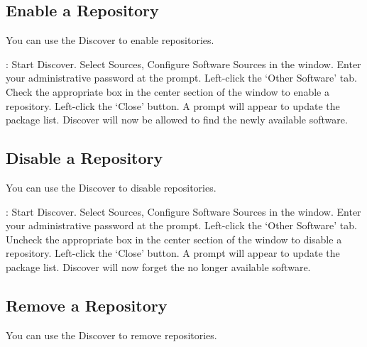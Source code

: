 \documentclass[letterpaper,10pt,english]{sphinxmanual}
\begin{document}




\subsection{Enable a Repository}
\label{\detokenize{docs/repositories:enable-a-repository}}
You can use the Discover to enable repositories.

: Start Discover. Select Sources, Configure Software Sources in the window. Enter your administrative password at the prompt. Left-click the ‘Other Software’ tab. Check the appropriate box in the center section of the window to enable a repository. Left-click the ‘Close’ button. A prompt will appear to update the package list. Discover will now be allowed to find the newly available software.


\subsection{Disable a Repository}
\label{\detokenize{docs/repositories:disable-a-repository}}
You can use the Discover to disable repositories.

: Start Discover. Select Sources, Configure Software Sources in the window. Enter your administrative password at the prompt. Left-click the ‘Other Software’ tab. Uncheck the appropriate box in the center section of the window to disable a repository. Left-click the ‘Close’ button. A prompt will appear to update the package list. Discover will now forget the no longer available software.


\subsection{Remove a Repository}
\label{\detokenize{docs/repositories:remove-a-repository}}
You can use the Discover to remove repositories.
\end{document}
